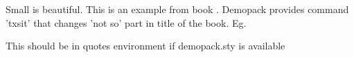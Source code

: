 \documentclass{article}
\begin{document}
Small is beautiful.
This is an example from book \tnss.
Demopack provides command 'txsit' that changes 'not so' part in title
of the book. Eg. 
\begin{king}
This should be in quotes environment if demopack.sty is available
\end{king}
\end{document}
